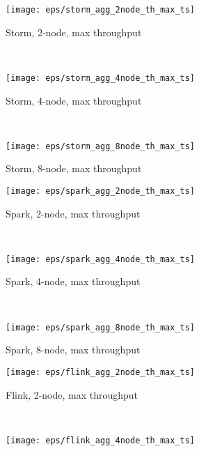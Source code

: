 \begin{figure*}
    \centering
    \begin{subfigure}[b]{0.3\textwidth}
        \texttt{[image: eps/storm\_agg\_2node\_th\_max\_ts]}

        \caption{Storm, 2-node, max   throughput }
    \end{subfigure}
    ~ 
    \begin{subfigure}[b]{0.3\textwidth}
        \texttt{[image: eps/storm\_agg\_4node\_th\_max\_ts]}

        \caption{Storm, 4-node, max   throughput }
    \end{subfigure}
    ~ 
    \begin{subfigure}[b]{0.3\textwidth}
        \texttt{[image: eps/storm\_agg\_8node\_th\_max\_ts]}

        \caption{Storm, 8-node, max   throughput }
                 \label{fig_storm_agg_8node_th_max_ts}
    \end{subfigure}



    \begin{subfigure}[b]{0.3\textwidth}
        \texttt{[image: eps/spark\_agg\_2node\_th\_max\_ts]}

        \caption{Spark, 2-node, max   throughput }
    \end{subfigure}
    ~ 
    \begin{subfigure}[b]{0.3\textwidth}
        \texttt{[image: eps/spark\_agg\_4node\_th\_max\_ts]}

        \caption{Spark, 4-node, max   throughput }
    \end{subfigure}
    ~ 
    \begin{subfigure}[b]{0.3\textwidth}
        \texttt{[image: eps/spark\_agg\_8node\_th\_max\_ts]}

        \caption{Spark, 8-node, max   throughput }
         \label{fig_spark_agg_8node_th_max_ts}
    \end{subfigure}



    \begin{subfigure}[b]{0.3\textwidth}
        \texttt{[image: eps/flink\_agg\_2node\_th\_max\_ts]}

        \caption{Flink, 2-node, max   throughput }
                \label{flink_agg_2node_th_max_ts}

    \end{subfigure}
    ~ 
    \begin{subfigure}[b]{0.3\textwidth}
        \texttt{[image: eps/flink\_agg\_4node\_th\_max\_ts]}


\end{subfigure}
\end{figure*}
